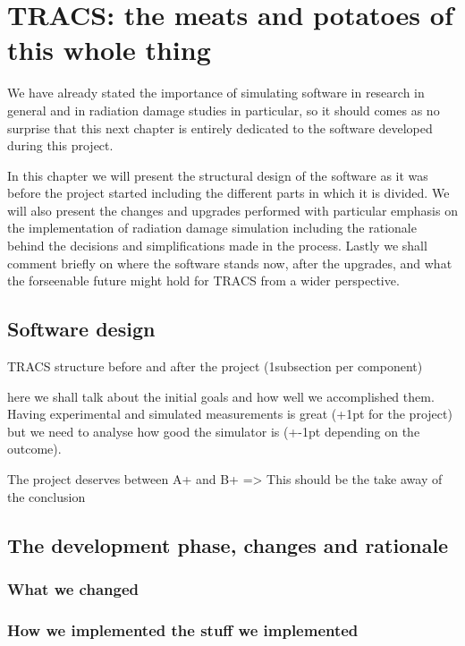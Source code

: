 \chapter{TRACS: the meats and potatoes of this whole thing}
\label{chap:Comp}

We have already stated the importance of simulating software in research in general and in radiation damage studies in particular, so it should comes as no surprise that this next chapter is entirely dedicated to the software developed during this project.

In this chapter we will present the structural design of the software as it was before the project started including the different parts in which it is divided. We will also present the changes and upgrades performed with particular emphasis on the implementation of radiation damage simulation including the rationale behind the decisions and simplifications made in the process. Lastly we shall comment briefly on where the software stands now, after the upgrades, and what the forseenable future might hold for TRACS from a wider perspective.

\section{Software design} %
\label{sec:results_and_achievements}

TRACS structure before and after the project (1subsection per component)

here we shall talk about the initial goals and how well we accomplished them. Having experimental and simulated measurements is great (+1pt for the project) but we need to analyse how good the simulator is (+-1pt depending on the outcome).

The project deserves between A+ and B+ => This should be the take away of the conclusion


\section{The development phase, changes and rationale} %
\label{sec:let_s_put_the_project_in_perspective}

\subsection{What we changed}

\subsection{How we implemented the stuff we implemented}

